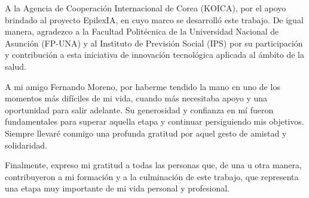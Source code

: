A la Agencia de Cooperación Internacional de Corea (KOICA),
por el apoyo brindado al proyecto EpilexIA, en cuyo marco se desarrolló este trabajo. De igual manera, agradezco
a la Facultad Politécnica de la Universidad Nacional de
Asunción (FP-UNA) y al Instituto de Previsión Social (IPS)
por su participación y contribución a esta iniciativa de
innovación tecnológica aplicada al ámbito de la salud.


A mi amigo Fernando Moreno, por haberme tendido
la mano en uno de los momentos más difíciles
de mi vida, cuando más necesitaba apoyo y una
oportunidad para salir adelante.
Su generosidad y confianza en mí fueron
fundamentales para superar aquella etapa
y continuar persiguiendo mis objetivos.
Siempre llevaré conmigo una profunda gratitud
por aquel gesto de amistad y solidaridad.


Finalmente, expreso mi gratitud a todas las personas que,
de una u otra manera, contribuyeron a mi formación y a
la culminación de este trabajo, que representa una etapa
muy importante de mi vida personal y profesional.


\par
\endgroup


